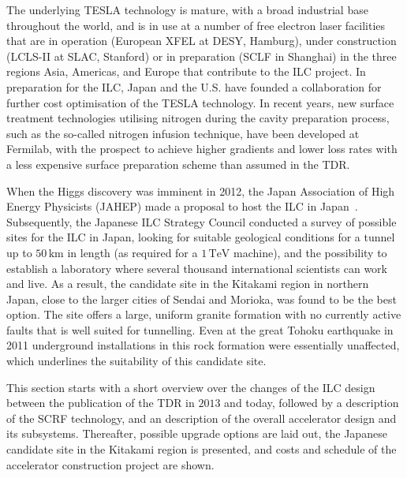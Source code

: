 The underlying TESLA technology is mature, with a broad industrial base throughout the world, and is in use at a number of free electron laser facilities that are in operation (European XFEL at DESY, Hamburg), under construction (LCLS-II at SLAC, Stanford) or in preparation (SCLF in Shanghai) in the three regions Asia, Americas, and Europe that contribute to the ILC project.
In preparation for the ILC, Japan and the U.S. have founded a collaboration for further cost optimisation of the TESLA technology.
In recent years, new surface treatment technologies utilising nitrogen during the cavity preparation process, such as the so-called   nitrogen infusion technique, have been developed at Fermilab, with the prospect to achieve higher gradients and lower loss rates with a less expensive surface preparation scheme than assumed in the TDR.

When the Higgs discovery was imminent in 2012, the Japan Association of High Energy Physicists (JAHEP) made a proposal to host the ILC in Japan~\cite{JAHEP:2012a,JAHEP:2012b}. 
Subsequently, the Japanese ILC Strategy Council conducted a survey of possible sites for the ILC in Japan, looking for  suitable geological conditions for a tunnel up to $50\,{\mathrm{km}}$ in length (as required for a $1\,{\mathrm{TeV}}$  machine), and the possibility to establish a laboratory where several thousand international scientists can work and live. 
As a result, the candidate site in the Kitakami region in northern Japan, close to the larger cities of Sendai and Morioka, was found to be the best option. 
The site offers a large, uniform granite formation with no currently active faults that is well suited for tunnelling.
Even at the great Tohoku earthquake in 2011 underground installations in this rock formation were essentially unaffected, which underlines the suitability of this candidate site. 

This section starts with a short overview over the changes of the ILC design between the publication of the TDR in $2013$ and today, followed by a description of the SCRF technology, and an description of the overall accelerator design and its subsystems. 
Thereafter, possible upgrade options are laid out, the Japanese candidate site in the Kitakami region is presented, and costs and schedule of the accelerator construction project are shown.


